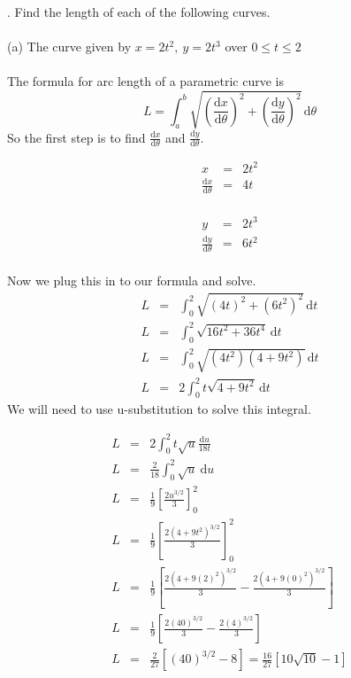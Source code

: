 \documentclass[11pt]{exam}
\begin{document}
. Find the length of each of the following curves. \\
\\
\indent (a) The curve given by $x=2t^2,\ y=2t^3$ over $0 \leq t \leq 2$\\
\\
The formula for arc length of a parametric curve is
$$L = \int_a^b \! \sqrt{\left(\frac{\mathrm{d}x}{\mathrm{d}\theta}\right)^2+\left(\frac{\mathrm{d}y}{\mathrm{d}\theta}\right)^2} \, \mathrm{d}\theta$$
So the first step is to find $\frac{\mathrm{d}x}{\mathrm{d}\theta}$ and $\frac{\mathrm{d}y}{\mathrm{d}\theta}$.\\
\noindent
\begin{minipage}{.5\linewidth}
	\begin{eqnarray*}
		x &=& 2t^2\\
 		\frac{\mathrm{d}x}{\mathrm{d}\theta}&=&4t\\
	\end{eqnarray*}
\end{minipage}
\begin{minipage}{.5\linewidth}
	\begin{eqnarray*}
  		y&=&2t^3\\
  		\frac{\mathrm{d}y}{\mathrm{d}\theta}&=&6t^2\\
	\end{eqnarray*}
\end{minipage}
Now we plug this in to our formula and solve.\\
\begin{eqnarray*}
	L &=& \int_0^2 \! \sqrt{(4t)^2+(6t^2)^2} \, \mathrm{d}t\\
	L &=& \int_0^2 \! \sqrt{16t^2+36t^4} \, \mathrm{d}t\\
	L &=& \int_0^2 \! \sqrt{(4t^2)(4+9t^2)} \, \mathrm{d}t\\
	L &=& 2\int_0^2 \! t\sqrt{4+9t^2} \, \mathrm{d}t
\end{eqnarray*} 
We will need to use u-substitution to solve this integral.\\
\noindent
\begin{minipage}{.5\linewidth}
	\begin{eqnarray*}
 		L &=& 2\int_0^2 \! t\sqrt{u}\frac{\mathrm{d}u}{18t} \\
 		L &=& \frac{2}{18}\int_0^2 \! \sqrt{u}\ \mathrm{d}u \\
 		L &=& \frac{1}{9}\left[\frac{2u^{3/2}}{3}\right]_0^2 \\
 		L &=& \frac{1}{9}\left[\frac{2(4+9t^2)^{3/2}}{3}\right]_0^2 \\
 		L &=& \frac{1}{9}\left[\frac{2(4+9(2)^2)^{3/2}}{3}-\frac{2(4+9(0)^2)^{3/2}}{3}\right] \\
 		L &=& \frac{1}{9}\left[\frac{2(40)^{3/2}}{3}-\frac{2(4)^{3/2}}{3}\right] \\
 		L &=& \frac{2}{27}\left[(40)^{3/2}-8\right] = \frac{16}{27}\left[10\sqrt{10}-1\right]\\
	\end{eqnarray*}
\end{minipage}
\end{document}
